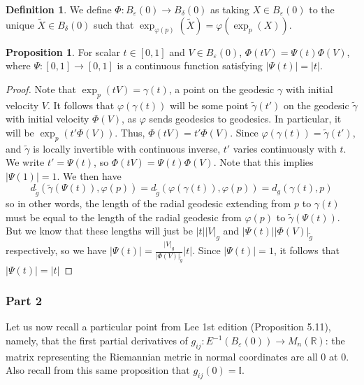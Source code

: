 \documentclass[aps,pra,showpacs,notitlepage,onecolumn,superscriptaddress,nofootinbib]{revtex4-1}
\theoremstyle{definition}
\newtheorem{definition}{Definition}[section]
\newtheorem{prop}{Proposition}[section]
\newcommand{\hhrulefill}{\hspace{-1.5em} \hrulefill}
\begin{document}
    \begin{definition}
    We define $\Phi : B_{\varepsilon}(0) \rightarrow B_{\delta}(0)$ as taking
    $X \in B_{\varepsilon}(0)$ to the unique $\widetilde{X} \in B_{\delta}(0)$ such that $\exp_{\varphi(p)}(\widetilde{X}) = \varphi(\exp_p(X))$.
    \end{definition}

    \begin{prop}
      For scalar $t \in [0, 1]$ and $V \in B_{\varepsilon}(0)$, $\Phi(tV) = \Psi(t) \Phi(V)$, where $\Psi : [0, 1] \rightarrow [0, 1]$ is a continuous function satisfying $|\Psi(t)| = |t|$.
    \end{prop}
    \begin{proof}
      Note that $\exp_p(tV) = \gamma(t)$, a point on the geodesic $\gamma$ with initial velocity $V$. It follows that $\varphi(\gamma(t))$ will be some point $\widetilde{\gamma}(t')$ on the
      geodesic $\widetilde{\gamma}$ with initial velocity $\Phi(V)$, as $\varphi$ sends geodesics to geodesics. In particular, it will be $\exp_p(t' \Phi(V))$. Thus, $\Phi(tV) = t' \Phi(V)$.
      Since $\varphi(\gamma(t)) = \widetilde{\gamma}(t')$, and $\widetilde{\gamma}$ is locally invertible with continuous inverse, $t'$ varies continuously with $t$. We write $t' = \Psi(t)$,
      so $\Phi(tV) = \Psi(t) \Phi(V)$. Note that this implies $|\Psi(1)| = 1$.
      We then have
      \begin{equation}
        d_{\widetilde{g}}(\widetilde{\gamma}(\Psi(t)), \varphi(p)) = d_{\widetilde{g}}(\varphi(\gamma(t)), \varphi(p)) = d_g(\gamma(t), p)
      \end{equation}
      so in other words, the length of the radial geodesic extending from $p$ to $\gamma(t)$ must be equal to the length of the radial geodesic from $\varphi(p)$ to $\widetilde{\gamma}(\Psi(t))$.
      But we know that these lengths will just be $|t||V|_g$ and $|\Psi(t)||\Phi(V)|_{\widetilde{g}}$ respectively, so we have $|\Psi(t)| = \frac{|V|_g}{|\Phi(V)|_{\widetilde{g}}} |t|$. Since $|\Psi(t)| = 1$,
      it follows that $|\Psi(t)| = |t|$
      \end{proof}

    \hhrulefill

    \subsubsection{Part 2}

    \noindent Let us now recall a particular point from Lee 1st edition (Proposition 5.11), namely,
that the first partial derivatives of $g_{ij} : E^{-1}(B_{\varepsilon}(0)) \rightarrow M_{n}(\mathbb{R})$: the matrix representing the Riemannian metric in normal coordinates are all $0$ at $0$. Also recall from this same
proposition that $g_{ij}(0) = \mathbb{I}$.
\newline
\end{document}
